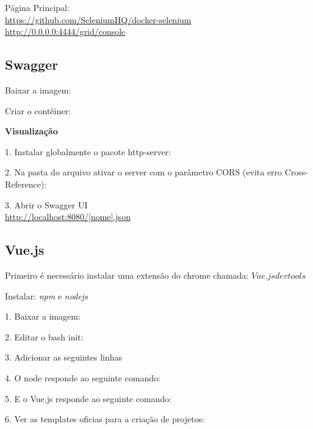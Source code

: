 \documentclass[a4paper,11pt]{article}
\begin{document}
Página Principal: \\
\url{https://github.com/SeleniumHQ/docker-selenium} \\
\url{http://0.0.0.0:4444/grid/console}

\subsection{Swagger}
Baixar a imagem: \\

Criar o contêiner: \\

\textbf{Visualização}

1. Instalar globalmente o pacote http-server: \\

2. Na pasta do arquivo ativar o server com o parâmetro CORS (evita erro Cross-Reference): \\

3. Abrir o Swagger UI \\
\url{http://localhost:8080/[nome].json}

\subsection{Vue.js}
Primeiro é necessário instalar uma extensão do chrome chamada: $Vue.js devtools$

Instalar: \textit{npm} e \textit{nodejs}

1. Baixar a imagem: \\

2. Editar o bash init:

3. Adicionar as seguintes linhas

4. O node responde ao seguinte comando: \\

5. E o Vue.js responde ao seguinte comando: \\

6. Ver as templates oficias para a criação de projetos: \\
\end{document}
